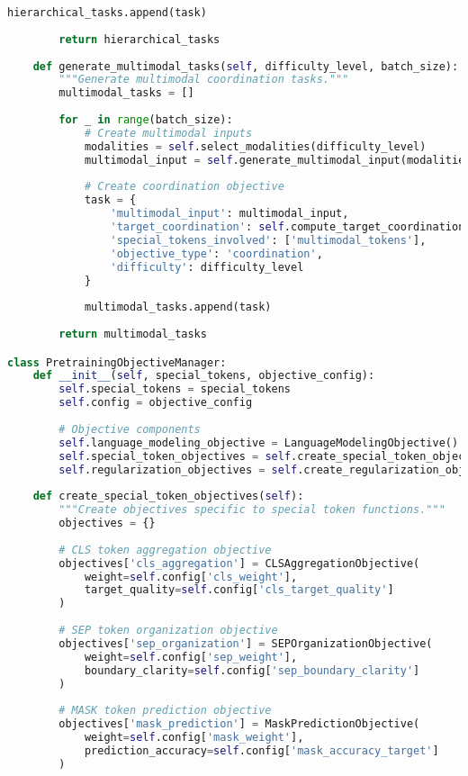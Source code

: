 \begin{lstlisting}[language=Python, caption=Progressive curriculum framework for special token pretraining]
            hierarchical_tasks.append(task)
        
        return hierarchical_tasks
    
    def generate_multimodal_tasks(self, difficulty_level, batch_size):
        """Generate multimodal coordination tasks."""
        multimodal_tasks = []
        
        for _ in range(batch_size):
            # Create multimodal inputs
            modalities = self.select_modalities(difficulty_level)
            multimodal_input = self.generate_multimodal_input(modalities)
            
            # Create coordination objective
            task = {
                'multimodal_input': multimodal_input,
                'target_coordination': self.compute_target_coordination(multimodal_input),
                'special_tokens_involved': ['multimodal_tokens'],
                'objective_type': 'coordination',
                'difficulty': difficulty_level
            }
            
            multimodal_tasks.append(task)
        
        return multimodal_tasks

class PretrainingObjectiveManager:
    def __init__(self, special_tokens, objective_config):
        self.special_tokens = special_tokens
        self.config = objective_config
        
        # Objective components
        self.language_modeling_objective = LanguageModelingObjective()
        self.special_token_objectives = self.create_special_token_objectives()
        self.regularization_objectives = self.create_regularization_objectives()
        
    def create_special_token_objectives(self):
        """Create objectives specific to special token functions."""
        objectives = {}
        
        # CLS token aggregation objective
        objectives['cls_aggregation'] = CLSAggregationObjective(
            weight=self.config['cls_weight'],
            target_quality=self.config['cls_target_quality']
        )
        
        # SEP token organization objective
        objectives['sep_organization'] = SEPOrganizationObjective(
            weight=self.config['sep_weight'],
            boundary_clarity=self.config['sep_boundary_clarity']
        )
        
        # MASK token prediction objective
        objectives['mask_prediction'] = MaskPredictionObjective(
            weight=self.config['mask_weight'],
            prediction_accuracy=self.config['mask_accuracy_target']
        )
        

\end{lstlisting}
